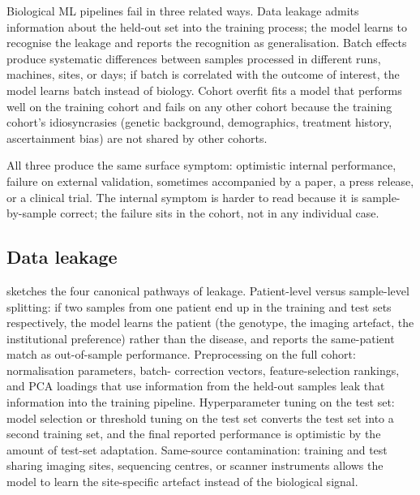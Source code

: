 Biological ML pipelines fail in three related ways. Data leakage admits
information about the held-out set into the training process; the
model learns to recognise the leakage and reports the recognition as
generalisation. Batch effects produce systematic differences between
samples processed in different runs, machines, sites, or days; if
batch is correlated with the outcome of interest, the model learns
batch instead of biology. Cohort overfit fits a model that performs
well on the training cohort and fails on any other cohort because the
training cohort's idiosyncrasies (genetic background, demographics,
treatment history, ascertainment bias) are not shared by other
cohorts.

All three produce the same surface symptom: optimistic internal
performance, failure on external validation, sometimes accompanied by
a paper, a press release, or a clinical trial. The internal symptom
is harder to read because it is sample-by-sample correct; the failure
sits in the cohort, not in any individual case.

\subsection{Data leakage}

 sketches the four canonical pathways
of leakage. Patient-level versus sample-level splitting: if two
samples from one patient end up in the training and test sets
respectively, the model learns the patient (the genotype, the imaging
artefact, the institutional preference) rather than the disease, and
reports the same-patient match as out-of-sample performance.
Preprocessing on the full cohort: normalisation parameters, batch-
correction vectors, feature-selection rankings, and PCA loadings that
use information from the held-out samples leak that information into
the training pipeline. Hyperparameter tuning on the test set: model
selection or threshold tuning on the test set converts the test set
into a second training set, and the final reported performance is
optimistic by the amount of test-set adaptation. Same-source
contamination: training and test sharing imaging sites, sequencing
centres, or scanner instruments allows the model to learn the
site-specific artefact instead of the biological signal.



